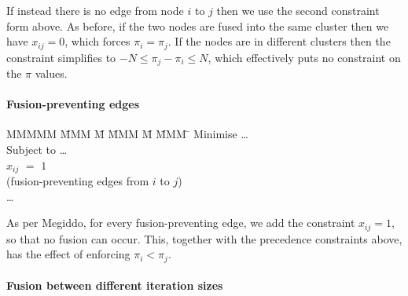 If instead there is no edge from node $i$ to $j$ then we use the second constraint form above. As before, if the two nodes are fused into the same cluster then we have $x_{ij} = 0$, which forces $\pi_i = \pi_j$. If the nodes are in different clusters then the constraint simplifies to $-N \le \pi_j - \pi_i \le N$, which effectively puts no constraint on the $\pi$ values.



\paragraph{Fusion-preventing edges}
\begin{tabbing}
MMMMM   \= MMM \= M \= MMM \= M \= MMM \= \kill
Minimise   \> \ldots \\
Subject to \> \ldots \\
           \> $x_{ij}$    \> $=$   \> $1$             \>       \>            \\
           \> (fusion-preventing edges from $i$ to $j$)      \\
           \> \ldots
\end{tabbing}
As per Megiddo\cite{megiddo1998optimal}, for every fusion-preventing edge, we add the constraint $x_{ij} = 1$, so that no fusion can occur. This, together with the precedence constraints above, has the effect of enforcing $\pi_i < \pi_j$.


\paragraph{Fusion between different iteration sizes}

